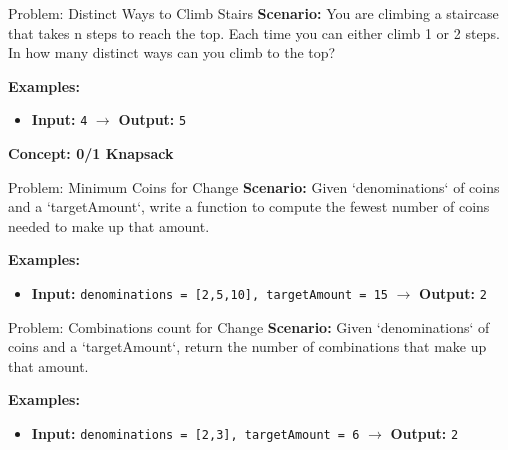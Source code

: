 \begin{frame}[fragile]{Problem: Distinct Ways to Climb Stairs}
  \textbf{Scenario:}
  You are climbing a staircase that takes n steps to reach the top. Each time you can either climb 1 or 2 steps. In how many distinct ways can you climb to the top?
  
  \vspace{0.3cm}
  \textbf{Examples:}
  \begin{itemize}
    \item \textbf{Input:} \texttt{4} $\rightarrow$ \textbf{Output:} \texttt{5}
  \end{itemize}
\end{frame}

\begin{frame}[c]{\empty}
    \begin{center}
        \Large \textbf{Concept: 0/1 Knapsack}
    \end{center}
\end{frame}

\begin{frame}[fragile]{Problem: Minimum Coins for Change}
  \textbf{Scenario:}
  Given `denominations` of coins and a `targetAmount`, write a function to compute the fewest number of coins needed to make up that amount.
  
  \vspace{0.3cm}
  \textbf{Examples:}
  \begin{itemize}
    \item \textbf{Input:} \texttt{denominations = [2,5,10], targetAmount = 15} $\rightarrow$ \textbf{Output:} \texttt{2}
  \end{itemize}
\end{frame}

\begin{frame}[fragile]{Problem: Combinations count for Change}
  \textbf{Scenario:}
  Given `denominations` of coins and a `targetAmount`, return the number of combinations that make up that amount.
  
  \vspace{0.3cm}
  \textbf{Examples:}
  \begin{itemize}
    \item \textbf{Input:} \texttt{denominations = [2,3], targetAmount = 6} $\rightarrow$ \textbf{Output:} \texttt{2}
  \end{itemize}
\end{frame}

